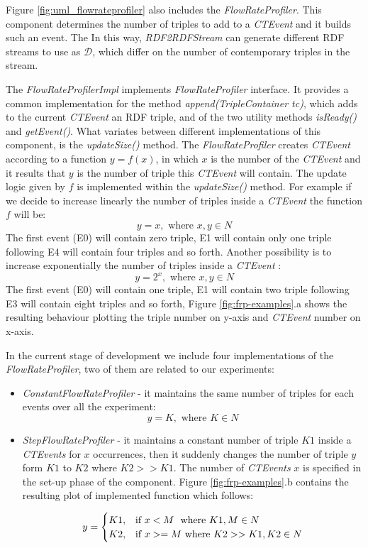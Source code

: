 Figure \ref{fig:uml_flowrateprofiler} also includes the \textit{FlowRateProfiler}. This component determines the number of triples to add to a \textit{CTEvent} and it builds such an event. The In this way, \textit{RDF2RDFStream} can generate different RDF streams to use as $\mathcal{D}$, which differ on the number of contemporary triples in the stream. 



The \textit{FlowRateProfilerImpl} implements \textit{FlowRateProfiler} interface. It provides a common implementation for the method \textit{append(TripleContainer tc)}, which adds to the current \textit{CTEvent} an RDF triple,  and of the two utility methods \textit{isReady()} and \textit{getEvent()}. What variates between different implementations of this component, is the \textit{updateSize()} method. The \textit{FlowRateProfiler} creates \textit{CTEvent} according to a function $y=f(x)$, in which $x$ is the number of the \textit{CTEvent} and it results that $y$ is the number of triple this \textit{CTEvent} will contain. The update logic given by $f$ is implemented within the \textit{updateSize()} method. For example if we decide to increase linearly the number of triples inside a \textit{CTEvent} the function $f$ will be: \[y=x, \text{ where } x,y \in N\]
The first event (E0) will contain zero triple, E1 will contain only one triple following E4 will contain four triples and so forth. Another possibility is to increase exponentially the number of triples inside a \textit{CTEvent} : \[y=2^x, \text{ where } x,y \in N\]The first event (E0) will contain one triple, E1 will contain two triple following E3 will contain eight triples and so forth, Figure \ref{fig:frp-examples}.a shows the resulting behaviour plotting the triple number on y-axis and \textit{CTEvent} number on x-axis.



In the current stage of development we include four implementations of the \textit{FlowRateProfiler}, two of them are related to our experiments: 
\begin{itemize}
\item \textit{ConstantFlowRateProfiler} - it maintains the same number of triples for each events over all the experiment: \\
\[y=K, \text{ where } K \in N \]

\item \textit{StepFlowRateProfiler} - it maintains a constant number of triple $K1$ inside a \textit{CTEvents} for $x$ occurrences, then it suddenly changes the number of triple $y$ form $K1$ to $K2$ where $K2 >> K1$. The number of  \textit{CTEvents} $x$ is specified in the set-up phase of the component.  Figure \ref{fig:frp-examples}.b contains the resulting plot of implemented function which follows:

\[
y=
\begin{cases}
K1, &\text{if $x < M$ } $ where $ K1, M \in N\\
K2, &\text{if $x >= M$} $ where $ K2 >> K1, K2 \in N
\end{cases}
\]


\end{itemize}

